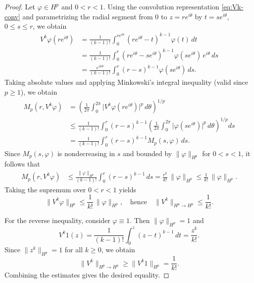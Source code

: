 \documentclass[preprint,12pt]{elsarticle}
\numberwithin{equation}{section}
\theoremstyle{remark}
\begin{document}
\begin{proof}
Let $\varphi\in H^p$ and $0<r<1$. Using the convolution representation \eqref{eq:Vk-conv} and parametrizing the radial segment from $0$ to $z=re^{i\theta}$ by $t=se^{i\theta}$, $0\le s\le r$, we obtain
\begin{align*}
V^k\varphi(re^{i\theta})
&= \frac{1}{(k-1)!}\int_{0}^{re^{i\theta}}(re^{i\theta}-t)^{k-1}\varphi(t)\,dt \\
&= \frac{1}{(k-1)!}\int_{0}^{r}(re^{i\theta}-se^{i\theta})^{k-1}\varphi(se^{i\theta})\,e^{i\theta}\,ds \\
&= \frac{e^{ik\theta}}{(k-1)!}\int_{0}^{r}(r-s)^{k-1}\varphi(se^{i\theta})\,ds.
\end{align*}
Taking absolute values and applying Minkowski's integral inequality (valid since $p\ge1$), we obtain
\begin{align*}
M_p(r,V^k\varphi)
&= \left(\frac{1}{2\pi}\int_{0}^{2\pi}\bigl|V^k\varphi(re^{i\theta})\bigr|^p\,d\theta\right)^{1/p} \\
&\le \frac{1}{(k-1)!}\int_{0}^{r}(r-s)^{k-1}
\left(\frac{1}{2\pi}\int_{0}^{2\pi}\bigl|\varphi(se^{i\theta})\bigr|^p\,d\theta\right)^{1/p} ds \\
&= \frac{1}{(k-1)!}\int_{0}^{r}(r-s)^{k-1} M_p(s,\varphi)\,ds.
\end{align*}
Since $M_p(s,\varphi)$ is nondecreasing in $s$ and bounded by $\|\varphi\|_{H^p}$ for $0<s<1$, it follows that
\begin{align*}
M_p(r,V^k\varphi)
&\le \frac{\|\varphi\|_{H^p}}{(k-1)!}\int_{0}^{r}(r-s)^{k-1}\,ds
= \frac{r^k}{k!}\,\|\varphi\|_{H^p}
\le \frac{1}{k!}\,\|\varphi\|_{H^p}.
\end{align*}
Taking the supremum over $0<r<1$ yields
\begin{equation*}
\|V^k\varphi\|_{H^p}\le \frac{1}{k!}\,\|\varphi\|_{H^p},
\quad\text{hence}\quad
\|V^k\|_{H^p\to H^p}\le \frac{1}{k!}.
\end{equation*}

For the reverse inequality, consider $\varphi\equiv1$. Then $\|\varphi\|_{H^p}=1$ and
\begin{equation*}
V^k1(z)=\frac{1}{(k-1)!}\int_{0}^{z}(z-t)^{k-1}\,dt=\frac{z^k}{k!}.
\end{equation*}
Since $\|z^k\|_{H^p}=1$ for all $k\ge0$, we obtain
\begin{equation*}
\|V^k\|_{H^p\to H^p}\ge \|V^k1\|_{H^p}=\frac{1}{k!}.
\end{equation*}
Combining the estimates gives the desired equality.
\end{proof}
\end{document}
